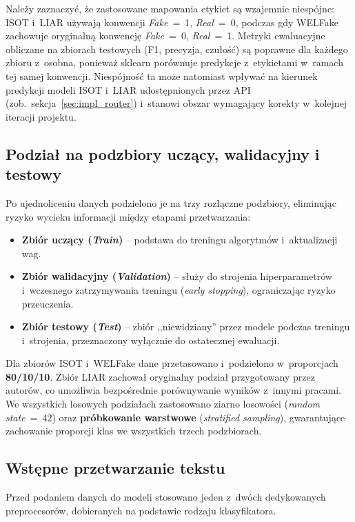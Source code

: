 \documentclass[oneside,polski,logo]{amuthesis}
\begin{document}
Należy zaznaczyć, że zastosowane mapowania etykiet są wzajemnie niespójne: ISOT i~LIAR używają konwencji \textit{Fake}~=~1, \textit{Real}~=~0, podczas gdy WELFake zachowuje oryginalną konwencję \textit{Fake}~=~0, \textit{Real}~=~1. Metryki ewaluacyjne obliczane na zbiorach testowych (F1, precyzja, czułość) są poprawne dla każdego zbioru z~osobna, ponieważ sklearn porównuje predykcje z~etykietami w~ramach tej samej konwencji. Niespójność ta może natomiast wpływać na kierunek predykcji modeli ISOT i~LIAR udostępnionych przez API (zob.\ sekcja~\ref{sec:impl_router}) i~stanowi obszar wymagający korekty w~kolejnej iteracji projektu.

\subsection{Podział na podzbiory uczący, walidacyjny i testowy}

Po ujednoliceniu danych podzielono je na trzy rozłączne podzbiory, eliminując ryzyko wycieku informacji między etapami przetwarzania:
\begin{itemize}
    \item \textbf{Zbiór uczący (\textit{Train})} -- podstawa do treningu algorytmów i~aktualizacji wag.
    \item \textbf{Zbiór walidacyjny (\textit{Validation})} -- służy do strojenia hiperparametrów i~wczesnego zatrzymywania treningu (\textit{early stopping}), ograniczając ryzyko przeuczenia.
    \item \textbf{Zbiór testowy (\textit{Test})} -- zbiór ,,niewidziany'' przez modele podczas treningu i~strojenia, przeznaczony wyłącznie do ostatecznej ewaluacji.
\end{itemize}

Dla zbiorów ISOT i~WELFake dane przetasowano i~podzielono w~proporcjach \textbf{80/10/10}. Zbiór LIAR zachował oryginalny podział przygotowany przez autorów, co umożliwia bezpośrednie porównywanie wyników z~innymi pracami. We wszystkich losowych podziałach zastosowano ziarno losowości (\textit{random state}~=~42) oraz \textbf{próbkowanie warstwowe} (\textit{stratified sampling}), gwarantujące zachowanie proporcji klas we wszystkich trzech podzbiorach.

\subsection{Wstępne przetwarzanie tekstu}

Przed podaniem danych do modeli stosowano jeden z~dwóch dedykowanych preprocesorów, dobieranych na podstawie rodzaju klasyfikatora.
\end{document}
